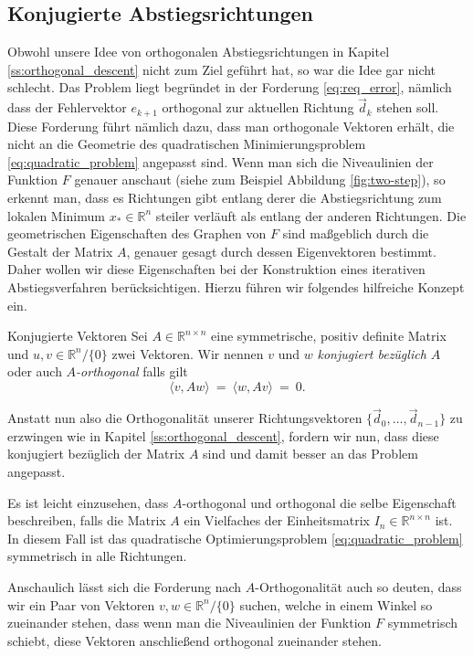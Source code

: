 \subsection{Konjugierte Abstiegsrichtungen}
\label{ss:conjugated_descent}
Obwohl unsere Idee von orthogonalen Abstiegsrichtungen in Kapitel \ref{ss:orthogonal_descent} nicht zum Ziel geführt hat, so war die Idee gar nicht schlecht.
Das Problem liegt begründet in der Forderung \eqref{eq:req_error}, nämlich dass der Fehlervektor $e_{k+1}$ orthogonal zur aktuellen Richtung $\vec{d}_k$ stehen soll.
Diese Forderung führt nämlich dazu, dass man orthogonale Vektoren erhält, die nicht an die Geometrie des quadratischen Minimierungsproblem \eqref{eq:quadratic_problem} angepasst sind.
Wenn man sich die Niveaulinien der Funktion $F$ genauer anschaut (siehe zum Beispiel Abbildung \ref{fig:two-step}), so erkennt man, dass es Richtungen gibt entlang derer die Abstiegsrichtung zum lokalen Minimum $x_* \in \mathbb{R}^n$ steiler verläuft als entlang der anderen Richtungen.
Die geometrischen Eigenschaften des Graphen von $F$ sind maßgeblich durch die Gestalt der Matrix $A$, genauer gesagt durch dessen Eigenvektoren bestimmt.
Daher wollen wir diese Eigenschaften bei der Konstruktion eines iterativen Abstiegsverfahren berücksichtigen.
Hierzu führen wir folgendes hilfreiche Konzept ein.
\begin{definition}{Konjugierte Vektoren}{}
Sei $A \in \mathbb{R}^{n\times n}$ eine symmetrische, positiv definite Matrix und $u,v \in \mathbb{R}^n / \lbrace 0\rbrace$ zwei Vektoren.
Wir nennen $v$ und $w$ \emph{konjugiert bezüglich $A$} oder auch \emph{$A$-orthogonal} falls gilt
\begin{equation*}
\langle v, Aw \rangle \ = \ \langle w, Av \rangle \ = \ 0.
\end{equation*}
\end{definition}
Anstatt nun also die Orthogonalität unserer Richtungsvektoren $\lbrace \vec{d}_0, \ldots, \vec{d}_{n-1}\rbrace$ zu erzwingen wie in Kapitel \ref{ss:orthogonal_descent}, fordern wir nun, dass diese konjugiert bezüglich der Matrix $A$ sind und damit besser an das Problem angepasst.
\begin{remark}{}{}
Es ist leicht einzusehen, dass $A$-orthogonal und orthogonal die selbe Eigenschaft beschreiben, falls die Matrix $A$ ein Vielfaches der Einheitsmatrix $I_n \in \mathbb{R}^{n \times n}$ ist. In diesem Fall ist das quadratische Optimierungsproblem \eqref{eq:quadratic_problem} symmetrisch in alle Richtungen.
\end{remark}
Anschaulich lässt sich die Forderung nach $A$-Orthogonalität auch so deuten, dass wir ein Paar von Vektoren $v,w \in \mathbb{R}^n / \lbrace 0\rbrace$ suchen, welche in einem Winkel so zueinander stehen, dass wenn man die Niveaulinien der Funktion $F$ symmetrisch schiebt, diese Vektoren anschließend orthogonal zueinander stehen.
